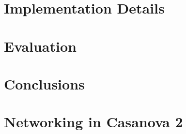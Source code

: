 \documentclass[conference]{IEEEtran}
\begin{document}
\section{Implementation Details}
\label{sec:details}


\section{Evaluation}
\label{sec:evaluation}


\section{Conclusions}
\label{sec:conclusions_and_future_works}


\section{Networking in Casanova 2}
\label{sec:networking}










\end{document}
